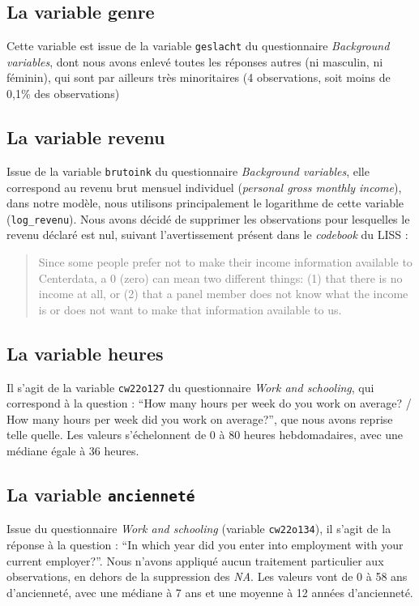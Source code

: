 \documentclass[a4paper, french, 11 pt]{article}\usepackage[]{graphicx}\usepackage[]{xcolor}
\begin{document}
\subsection{La variable genre}

Cette variable est issue de la variable \texttt{geslacht} du questionnaire \textit{Background variables}, dont nous avons enlevé toutes les réponses autres (ni masculin, ni féminin), qui sont par ailleurs très minoritaires (4 observations, soit moins de 0,1\% des observations)

\subsection{La variable revenu}

Issue de la variable \texttt{brutoink} du questionnaire \textit{Background variables}, elle correspond au revenu brut mensuel individuel (\textit{personal gross monthly income}), dans notre modèle, nous utilisons principalement le logarithme de cette variable (\verb+log_revenu+). Nous avons décidé de supprimer les observations pour lesquelles le revenu déclaré est nul, suivant l'avertissement présent dans le \textit{codebook} du LISS : 

\begin{quote}
\textcolor{gray}{Since some people prefer not to make their income information available to Centerdata, a 0 (zero) can mean two different things: (1) that there is no income at all, or (2) that a panel member does not know what the income is or does not want to make that information available to us.}
\end{quote}

\subsection{La variable heures}

Il s'agit de la variable \texttt{cw22o127} du questionnaire \textit{Work and schooling}, qui correspond à la question : \enquote{How many hours per week do you work on average? / How many hours per week did you work on average?}, que nous avons reprise telle quelle. Les valeurs s'échelonnent de 0 à 80 heures hebdomadaires, avec une médiane égale à 36 heures.

\subsection{La variable \texttt{ancienneté}}

Issue du questionnaire \textit{Work and schooling} (variable \texttt{cw22o134}), il s'agit de la réponse à la question : \enquote{In which year did you enter into employment with your current employer?}. Nous n'avons appliqué aucun traitement particulier aux observations, en dehors de la suppression des \textit{NA}. Les valeurs vont de 0 à 58 ans d'ancienneté, avec une médiane à 7 ans et une moyenne à 12 années d'ancienneté. 
\end{document}

